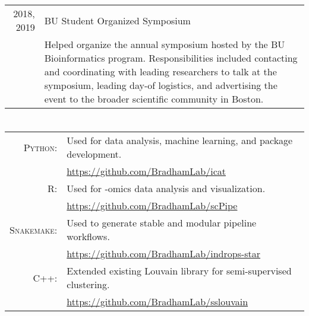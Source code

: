 \documentclass[a4paper,10pt]{article}
\begin{document}
\begin{tabular}{rp{10cm}}
	2018, 2019
	 & BU Student Organized Symposium                                                                                                                           \\
	 & \footnotesize{Helped organize the annual symposium hosted by the BU
		Bioinformatics program. Responsibilities included contacting and
		coordinating with leading researchers to talk at the symposium,
		leading day-of logistics, and advertising the event to the broader
	scientific community in Boston.}                                                                                                                            \\
\end{tabular}

\section{\color{linkcolour}{Programming Languages}}
\begin{tabular}{rl}
	\textsc{Python:}    & Used for data analysis, machine learning, and package development.                          \\
	                    & \small{\href{https://github.com/BradhamLab/icat}{https://github.com/BradhamLab/icat}}     \\
	\textsc{R:}         & Used for -omics data analysis and visualization.                                                      \\
	                    & \small{\href{https://github.com/BradhamLab/scPipe}{https://github.com/BradhamLab/scPipe}}             \\
	\textsc{Snakemake:} & Used to generate stable and modular pipeline workflows.                                               \\
	                    & \small{\href{https://github.com/BradhamLab/indrops-star}{https://github.com/BradhamLab/indrops-star}} \\
	\textsc{C++:}       & Extended existing Louvain library for semi-supervised clustering.                                     \\
	                    & \small{\href{https://github.com/BradhamLab/sslouvain}{https://github.com/BradhamLab/sslouvain}}       \\
\end{tabular}
\end{document}
